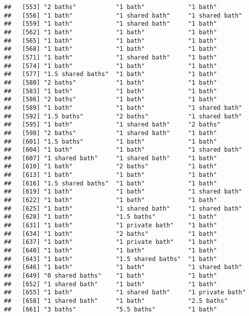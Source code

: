 \documentclass[
]{article}
\begin{document}
\begin{verbatim}
##   [553] "2 baths"           "1 bath"            "1 bath"           
##   [556] "1 bath"            "1 shared bath"     "1 shared bath"    
##   [559] "1 bath"            "1 shared bath"     "1 bath"           
##   [562] "1 bath"            "1 bath"            "1 bath"           
##   [565] "1 bath"            "1 bath"            "1 bath"           
##   [568] "1 bath"            "1 bath"            "1 bath"           
##   [571] "1 bath"            "1 shared bath"     "1 bath"           
##   [574] "1 bath"            "1 bath"            "1 bath"           
##   [577] "1.5 shared baths"  "1 bath"            "1 bath"           
##   [580] "2 baths"           "1 bath"            "1 bath"           
##   [583] "1 bath"            "1 bath"            "1 bath"           
##   [586] "2 baths"           "1 bath"            "1 bath"           
##   [589] "1 bath"            "1 bath"            "1 shared bath"    
##   [592] "1.5 baths"         "2 baths"           "1 shared bath"    
##   [595] "1 bath"            "1 shared bath"     "2 baths"          
##   [598] "2 baths"           "1 shared bath"     "1 bath"           
##   [601] "1.5 baths"         "1 bath"            "1 bath"           
##   [604] "1 bath"            "1 bath"            "1 shared bath"    
##   [607] "1 shared bath"     "1 shared bath"     "1 bath"           
##   [610] "1 bath"            "2 baths"           "1 bath"           
##   [613] "1 bath"            "1 bath"            "1 bath"           
##   [616] "1.5 shared baths"  "1 bath"            "1 bath"           
##   [619] "1 bath"            "1 bath"            "1 shared bath"    
##   [622] "1 bath"            "1 bath"            "1 bath"           
##   [625] "1 bath"            "1 shared bath"     "1 shared bath"    
##   [628] "1 bath"            "1.5 baths"         "1 bath"           
##   [631] "1 bath"            "1 private bath"    "1 bath"           
##   [634] "1 bath"            "2 baths"           "1 bath"           
##   [637] "1 bath"            "1 private bath"    "1 bath"           
##   [640] "1 bath"            "1 bath"            "1 bath"           
##   [643] "1 bath"            "1.5 shared baths"  "1 bath"           
##   [646] "1 bath"            "1 bath"            "1 shared bath"    
##   [649] "0 shared baths"    "1 bath"            "1 bath"           
##   [652] "1 shared bath"     "1 bath"            "1 bath"           
##   [655] "1 bath"            "1 shared bath"     "1 private bath"   
##   [658] "1 shared bath"     "1 bath"            "2.5 baths"        
##   [661] "3 baths"           "5.5 baths"         "1 bath"           

\end{verbatim}
\end{document}
